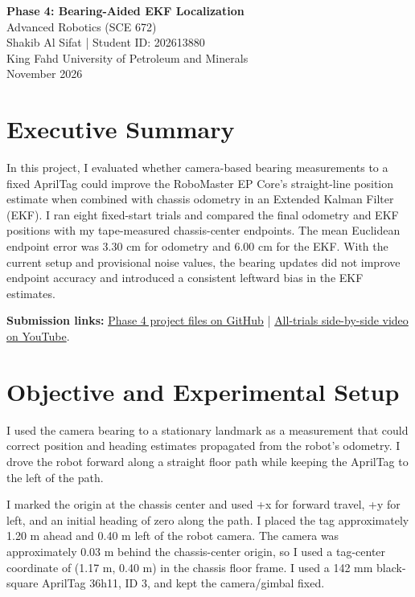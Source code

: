 \documentclass[11pt]{article}
\begin{document}
\begin{center}
{\LARGE\bfseries\color{navy} Phase 4: Bearing-Aided EKF Localization}\\[4pt]
{\large Advanced Robotics (SCE 672)}\\[8pt]
{\large Shakib Al Sifat \quad | \quad Student ID: 202613880}\\
King Fahd University of Petroleum and Minerals\\
November 2026
\end{center}

\section*{Executive Summary}
In this project, I evaluated whether camera-based bearing measurements to a fixed AprilTag could improve the RoboMaster EP Core's straight-line position estimate when combined with chassis odometry in an Extended Kalman Filter (EKF). I ran eight fixed-start trials and compared the final odometry and EKF positions with my tape-measured chassis-center endpoints. The mean Euclidean endpoint error was 3.30 cm for odometry and 6.00 cm for the EKF. With the current setup and provisional noise values, the bearing updates did not improve endpoint accuracy and introduced a consistent leftward bias in the EKF estimates.

\textbf{Submission links:} \href{https://github.com/ssifat109/robomaster-odometry-phase3/tree/main/phase4}{Phase 4 project files on GitHub} \quad | \quad \href{https://youtube.com/shorts/OIwx5EAHnV4}{All-trials side-by-side video on YouTube}.

\section{Objective and Experimental Setup}
I used the camera bearing to a stationary landmark as a measurement that could correct position and heading estimates propagated from the robot's odometry. I drove the robot forward along a straight floor path while keeping the AprilTag to the left of the path.

I marked the origin at the chassis center and used +x for forward travel, +y for left, and an initial heading of zero along the path. I placed the tag approximately 1.20 m ahead and 0.40 m left of the robot camera. The camera was approximately 0.03 m behind the chassis-center origin, so I used a tag-center coordinate of (1.17 m, 0.40 m) in the chassis floor frame. I used a 142 mm black-square AprilTag 36h11, ID 3, and kept the camera/gimbal fixed.
\end{document}
